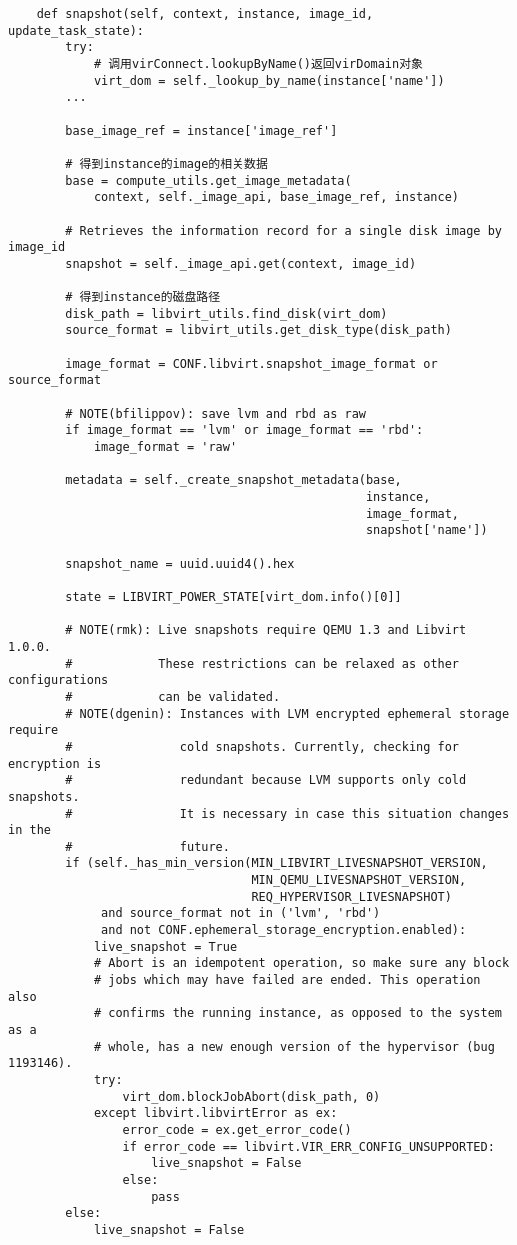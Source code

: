 \documentclass[a4paper,left=1.5cm,right=1.5cm,11pt]{article}
\begin{document}
    \begin{lstlisting}
    def snapshot(self, context, instance, image_id, update_task_state):
        try:
            # 调用virConnect.lookupByName()返回virDomain对象
            virt_dom = self._lookup_by_name(instance['name'])
        ...

        base_image_ref = instance['image_ref']

        # 得到instance的image的相关数据
        base = compute_utils.get_image_metadata(
            context, self._image_api, base_image_ref, instance)
        
        # Retrieves the information record for a single disk image by image_id
        snapshot = self._image_api.get(context, image_id)

        # 得到instance的磁盘路径
        disk_path = libvirt_utils.find_disk(virt_dom)
        source_format = libvirt_utils.get_disk_type(disk_path)

        image_format = CONF.libvirt.snapshot_image_format or source_format

        # NOTE(bfilippov): save lvm and rbd as raw
        if image_format == 'lvm' or image_format == 'rbd':
            image_format = 'raw'

        metadata = self._create_snapshot_metadata(base,
                                                  instance,
                                                  image_format,
                                                  snapshot['name'])

        snapshot_name = uuid.uuid4().hex

        state = LIBVIRT_POWER_STATE[virt_dom.info()[0]]

        # NOTE(rmk): Live snapshots require QEMU 1.3 and Libvirt 1.0.0.
        #            These restrictions can be relaxed as other configurations
        #            can be validated.
        # NOTE(dgenin): Instances with LVM encrypted ephemeral storage require
        #               cold snapshots. Currently, checking for encryption is
        #               redundant because LVM supports only cold snapshots.
        #               It is necessary in case this situation changes in the
        #               future.
        if (self._has_min_version(MIN_LIBVIRT_LIVESNAPSHOT_VERSION,
                                  MIN_QEMU_LIVESNAPSHOT_VERSION,
                                  REQ_HYPERVISOR_LIVESNAPSHOT)
             and source_format not in ('lvm', 'rbd')
             and not CONF.ephemeral_storage_encryption.enabled):
            live_snapshot = True
            # Abort is an idempotent operation, so make sure any block
            # jobs which may have failed are ended. This operation also
            # confirms the running instance, as opposed to the system as a
            # whole, has a new enough version of the hypervisor (bug 1193146).
            try:
                virt_dom.blockJobAbort(disk_path, 0)
            except libvirt.libvirtError as ex:
                error_code = ex.get_error_code()
                if error_code == libvirt.VIR_ERR_CONFIG_UNSUPPORTED:
                    live_snapshot = False
                else:
                    pass
        else:
            live_snapshot = False


\end{lstlisting}
\end{document}
